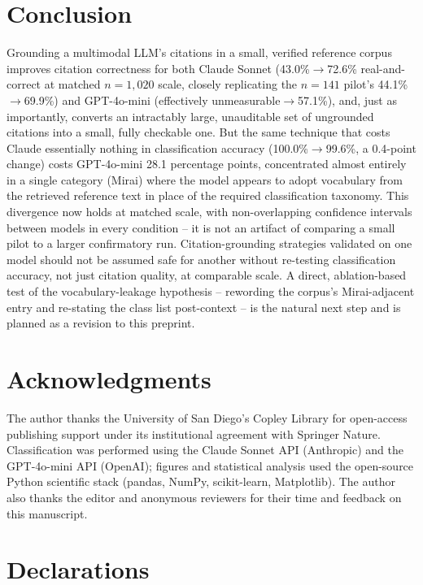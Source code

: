 \documentclass[10pt,twocolumn]{article}
\begin{document}
\section{Conclusion}

Grounding a multimodal LLM's citations in a small, verified reference corpus improves citation
correctness for both Claude Sonnet (43.0\%$\to$72.6\% real-and-correct at matched $n=1{,}020$
scale, closely replicating the $n=141$ pilot's 44.1\%$\to$69.9\%) and GPT-4o-mini (effectively
unmeasurable$\to$57.1\%), and, just as importantly, converts an intractably large, unauditable set
of ungrounded citations into a small, fully checkable one. But the same technique that costs
Claude essentially nothing in classification accuracy (100.0\%$\to$99.6\%, a 0.4-point change)
costs GPT-4o-mini 28.1 percentage points, concentrated almost entirely in a single category
(Mirai) where the model appears to adopt vocabulary from the retrieved reference text in place of
the required classification taxonomy. This divergence now holds at matched scale, with
non-overlapping confidence intervals between models in every condition -- it is not an artifact of
comparing a small pilot to a larger confirmatory run. Citation-grounding strategies validated on
one model should not be assumed safe for another without re-testing classification accuracy, not
just citation quality, at comparable scale. A direct, ablation-based test of the
vocabulary-leakage hypothesis -- rewording the corpus's Mirai-adjacent entry and re-stating the
class list post-context -- is the natural next step and is planned as a revision to this
preprint.

\section*{Acknowledgments}

The author thanks the University of San Diego's Copley Library for open-access publishing
support under its institutional agreement with Springer Nature. Classification was performed
using the Claude Sonnet API (Anthropic) and the GPT-4o-mini API (OpenAI); figures and statistical
analysis used the open-source Python scientific stack (pandas, NumPy, scikit-learn, Matplotlib).
The author also thanks the editor and anonymous reviewers for their time and feedback on this
manuscript.

\section*{Declarations}
\end{document}
